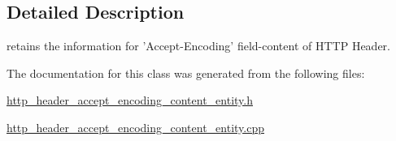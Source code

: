 \subsection{Detailed Description}
retains the information for 'Accept-\/\-Encoding' field-\/content of H\-T\-T\-P Header. 

The documentation for this class was generated from the following files\-:\begin{DoxyCompactItemize}
\item 
\hyperlink{http__header__accept__encoding__content__entity_8h}{http\-\_\-header\-\_\-accept\-\_\-encoding\-\_\-content\-\_\-entity.\-h}\item 
\hyperlink{http__header__accept__encoding__content__entity_8cpp}{http\-\_\-header\-\_\-accept\-\_\-encoding\-\_\-content\-\_\-entity.\-cpp}\end{DoxyCompactItemize}
